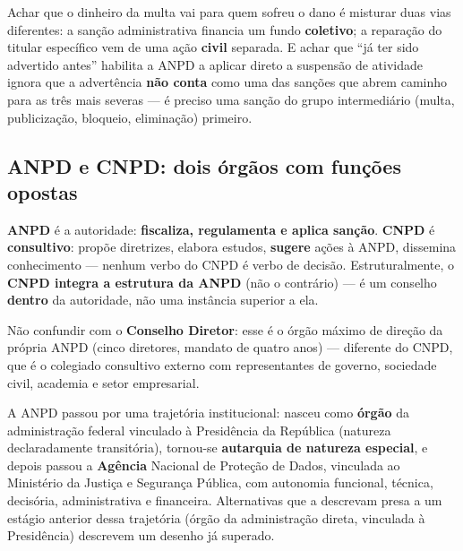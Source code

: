 \begin{cuidado}
Achar que o dinheiro da multa vai para quem sofreu o dano é misturar duas
vias diferentes: a sanção administrativa financia um fundo
\textbf{coletivo}; a reparação do titular específico vem de uma ação
\textbf{civil} separada. E achar que “já ter sido advertido antes”
habilita a ANPD a aplicar direto a suspensão de atividade ignora que a
advertência \textbf{não conta} como uma das sanções que abrem caminho para
as três mais severas --- é preciso uma sanção do grupo intermediário
(multa, publicização, bloqueio, eliminação) primeiro.
\end{cuidado}

\subsection{ANPD e CNPD: dois órgãos com funções opostas}

\begin{conceito}
\textbf{ANPD} é a autoridade: \textbf{fiscaliza, regulamenta e aplica
sanção}. \textbf{CNPD} é \textbf{consultivo}: propõe diretrizes,
elabora estudos, \textbf{sugere} ações à ANPD, dissemina conhecimento ---
nenhum verbo do CNPD é verbo de decisão. Estruturalmente, o \textbf{CNPD
integra a estrutura da ANPD} (não o contrário) --- é um conselho
\textbf{dentro} da autoridade, não uma instância superior a ela.

Não confundir com o \textbf{Conselho Diretor}: esse é o órgão máximo de
direção da própria ANPD (cinco diretores, mandato de quatro anos) ---
diferente do CNPD, que é o colegiado consultivo externo com representantes
de governo, sociedade civil, academia e setor empresarial.

A ANPD passou por uma trajetória institucional: nasceu como \textbf{órgão}
da administração federal vinculado à Presidência da República (natureza
declaradamente transitória), tornou-se \textbf{autarquia de natureza
especial}, e depois passou a \textbf{Agência} Nacional de Proteção de
Dados, vinculada ao Ministério da Justiça e Segurança Pública, com
autonomia funcional, técnica, decisória, administrativa e financeira.
Alternativas que a descrevam presa a um estágio anterior dessa trajetória
(órgão da administração direta, vinculada à Presidência) descrevem um
desenho já superado.
\end{conceito}


